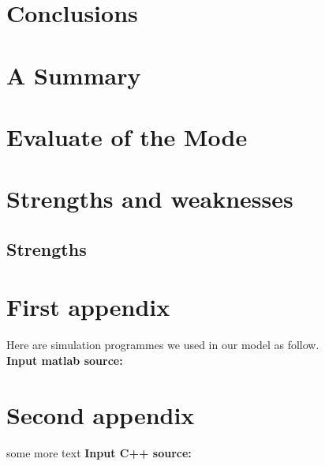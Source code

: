 \documentclass{mcmthesis}
\begin{document}
\section{Conclusions}

\section{A Summary}

\section{Evaluate of the Mode}

\section{Strengths and weaknesses}

\subsection{Strengths}

\newpage




\begin{appendices}

\section{First appendix}

Here are simulation programmes we used in our model as follow.\\

\textbf{\textcolor[rgb]{0.98,0.00,0.00}{Input matlab source:}}


\section{Second appendix}

some more text \textcolor[rgb]{0.98,0.00,0.00}{\textbf{Input C++ source:}}


\end{appendices}
\end{document}
